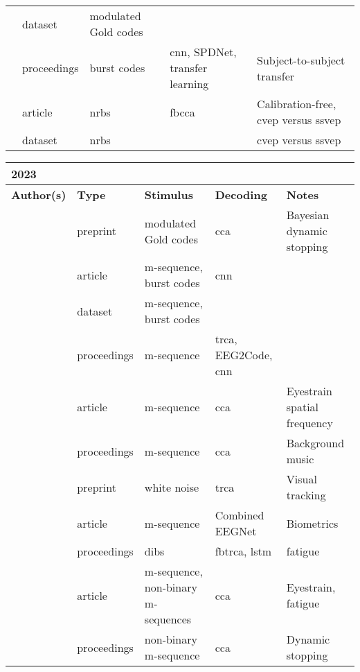 \documentclass[a4paper,landscape]{article}
\begin{document}
\begin{table}[H]
\begin{tabular}{p{5cm}p{2cm}p{5cm}p{5cm}p{6.5cm}}
		\citeauthor{thielen2024dataset} & dataset & modulated Gold codes & & \\
		\citeauthor{velut2024} & proceedings & burst codes & \acrshort{cnn}, SPDNet, transfer learning & Subject-to-subject transfer \\
		\citeauthor{zheng2024a} & article & \acrshort{nrbs} & \acrshort{fbcca} & Calibration-free, \acrshort{cvep} versus \acrshort{ssvep} \\
		\citeauthor{zheng2024b} & dataset & \acrshort{nrbs} & & \acrshort{cvep} versus \acrshort{ssvep} \\
		\bottomrule
	\end{tabular}
\end{table}

\begin{table}[H]
	\begin{tabular}{p{5cm}p{2cm}p{5cm}p{5cm}p{6.5cm}}
		\textbf{2023} & & & & \\ 
		\toprule
		\textbf{Author(s)} & \textbf{Type} & \textbf{Stimulus} & \textbf{Decoding} & \textbf{Notes} \\
		\midrule
		\citeauthor{ahmadi2023} & preprint & modulated Gold codes & \acrshort{cca} & Bayesian dynamic stopping \\
		\citeauthor{castillos2023} & article & m-sequence, burst codes & \acrshort{cnn} & \\
		\citeauthor{castillos2023dataset} & dataset & m-sequence, burst codes & & \\
		\citeauthor{darmet2023} & proceedings & m-sequence & \acrshort{trca}, EEG2Code, \acrshort{cnn} & \\
		\citeauthor{fernandez2023} & article & m-sequence & \acrshort{cca} & Eyestrain spatial frequency \\
		\citeauthor{henke2023} & proceedings & m-sequence & \acrshort{cca} & Background music \\
		\citeauthor{huang2023a} & preprint & white noise & \acrshort{trca} & Visual tracking \\
		\citeauthor{huang2023b} & article & m-sequence & Combined EEGNet & Biometrics \\
		\citeauthor{lai2023} & proceedings & \acrshort{dibs} & \acrshort{fbtrca}, \acrshort{lstm} & fatigue \\
		\citeauthor{martinez2023a} & article & m-sequence, non-binary m-sequences & \acrshort{cca} & Eyestrain, fatigue \\
		\citeauthor{martinez2023b} & proceedings & non-binary m-sequence & \acrshort{cca} & Dynamic stopping \\

\end{tabular}
\end{table}
\end{document}
